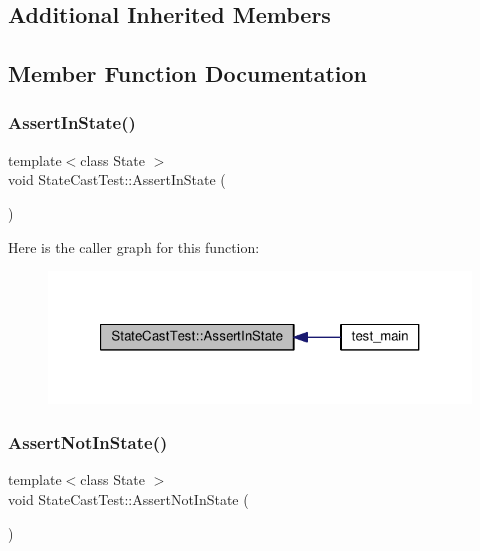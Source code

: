 \subsection*{Additional Inherited Members}


\subsection{Member Function Documentation}
\mbox{\label{struct_state_cast_test_a0ca69a96b446253bafc300eb491faef8}} 
\subsubsection{\texorpdfstring{Assert\+In\+State()}{AssertInState()}}
{\footnotesize\ttfamily template$<$class State $>$ \\
void State\+Cast\+Test\+::\+Assert\+In\+State (\begin{DoxyParamCaption}{ }\end{DoxyParamCaption})\hspace{0.3cm}{\ttfamily [inline]}}

Here is the caller graph for this function\+:
\nopagebreak
\begin{figure}[H]
\begin{center}
\leavevmode
\includegraphics[width=321pt]{struct_state_cast_test_a0ca69a96b446253bafc300eb491faef8_icgraph}
\end{center}
\end{figure}
\mbox{\label{struct_state_cast_test_a38608dc3d0e46414340f6333a0d16f5e}} 
\subsubsection{\texorpdfstring{Assert\+Not\+In\+State()}{AssertNotInState()}}
{\footnotesize\ttfamily template$<$class State $>$ \\
void State\+Cast\+Test\+::\+Assert\+Not\+In\+State (\begin{DoxyParamCaption}{ }\end{DoxyParamCaption})\hspace{0.3cm}{\ttfamily [inline]}}

